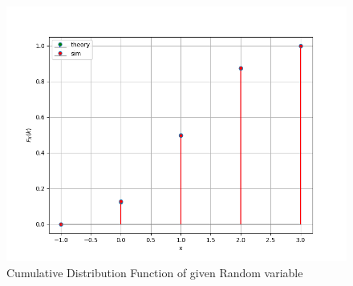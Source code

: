 \documentclass[journal]{IEEEtran}
\begin{document}
\begin{figure}[h!]
   \centering
   \includegraphics[width=1\columnwidth]{figs/cdf.png}
    \caption{Cumulative Distribution Function of given Random variable}
\end{figure}
\end{document}
